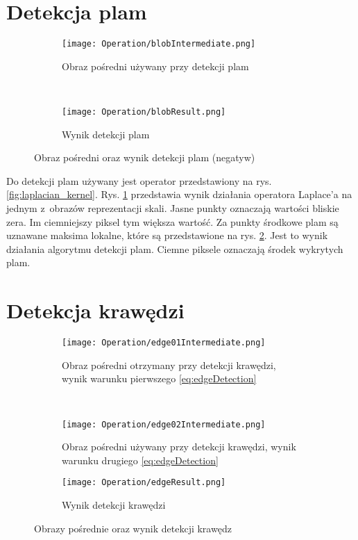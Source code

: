 \section{Detekcja plam}
\label{sec:dzialanieBlob}

\begin{figure}[h]
\begin{center}

\begin{subfigure}[t]{0.3\textwidth}
\texttt{[image: Operation/blobIntermediate.png]}
\caption{Obraz pośredni używany przy detekcji plam}
\label{fig:blobIntermediate}
\end{subfigure}
~
\begin{subfigure}[t]{0.3\textwidth}
\texttt{[image: Operation/blobResult.png]}
\caption{Wynik detekcji plam}
\label{fig:blobResult}
\end{subfigure}

\end{center}
\label{fig:showBlob}
\caption{Obraz pośredni oraz wynik detekcji plam (negatyw)}
\end{figure}

Do detekcji plam używany jest operator przedstawiony na rys. \ref{fig:laplacian_kernel}. Rys. \ref{fig:blobIntermediate} przedstawia wynik działania operatora Laplace'a na jednym z~obrazów reprezentacji skali. Jasne punkty oznaczają wartości bliskie zera. Im ciemniejszy piksel tym większa wartość. Za punkty środkowe plam są uznawane maksima lokalne, które są przedstawione na rys. \ref{fig:blobResult}. Jest to wynik działania algorytmu detekcji plam. Ciemne piksele oznaczają środek wykrytych plam.

\section{Detekcja krawędzi}
\label{sec:dzialanieEdge}

\begin{figure}[h]
\begin{center}

\begin{subfigure}[t]{0.3\textwidth}
\texttt{[image: Operation/edge01Intermediate.png]}
\caption{Obraz pośredni otrzymany przy detekcji krawędzi, wynik warunku pierwszego \eqref{eq:edgeDetection}}
\label{fig:edgeIntermediate1}
\end{subfigure}
~
\begin{subfigure}[t]{0.3\textwidth}
\texttt{[image: Operation/edge02Intermediate.png]}
\caption{Obraz pośredni używany przy detekcji krawędzi, wynik warunku drugiego \eqref{eq:edgeDetection}}
\label{fig:edgeIntermediate2}
\end{subfigure}

\begin{subfigure}[t]{0.3\textwidth}
\texttt{[image: Operation/edgeResult.png]}
\caption{Wynik detekcji krawędzi}
\label{fig:edgeResult}
\end{subfigure}

\end{center}
\label{fig:showEdge}
\caption{Obrazy pośrednie oraz wynik detekcji krawędz}
\end{figure}

